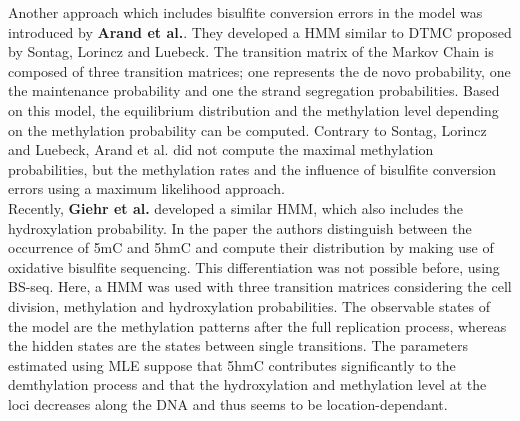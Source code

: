 Another approach which includes bisulfite conversion errors in the model was introduced by \textbf{Arand et al.}\cite{Wolf}. They developed a \ac{HMM} similar to \ac{DTMC} proposed by Sontag, Lorincz and Luebeck\cite{Sontag}. The transition matrix of the Markov Chain is composed of three transition matrices; one represents the de novo probability, one the maintenance probability and one the strand segregation probabilities. Based on this model, the equilibrium distribution and the methylation level depending on the methylation probability can be computed. Contrary to Sontag, Lorincz and Luebeck, Arand et al. did not compute the maximal methylation probabilities, but the methylation rates and the influence of bisulfite conversion errors using a maximum likelihood approach.\\

Recently, \textbf{Giehr et al.}\cite{Giehr} developed a similar \ac{HMM}, which also includes the hydroxylation probability. In the paper the authors distinguish between the occurrence of \ac{5mC} and \ac{5hmC} and compute their distribution by making use of oxidative bisulfite sequencing. This differentiation was not possible before, using \ac{BS-seq}. Here, a \ac{HMM} was used with three transition matrices considering the cell division, methylation and hydroxylation probabilities. The observable states of the model are the methylation patterns after the full replication process, whereas the hidden states are the states between single transitions. The parameters estimated using \ac{MLE} suppose that \ac{5hmC} contributes significantly to the demthylation process and that the hydroxylation and methylation level at the loci decreases along the DNA and thus seems to be location-dependant.\\

